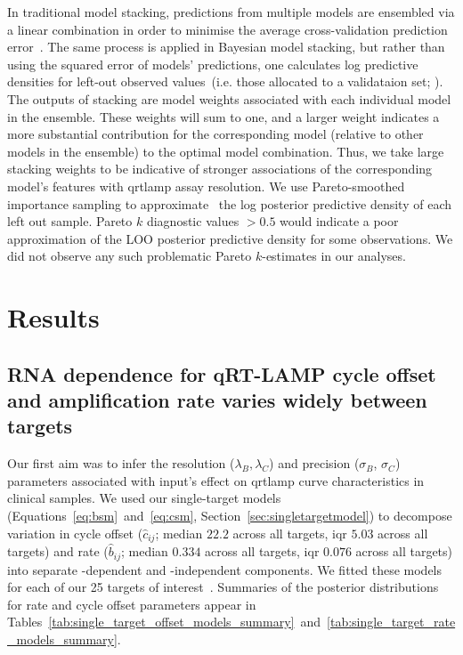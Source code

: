\documentclass[../thesis.tex]{subfiles}
\begin{document}
In traditional model stacking, predictions from multiple models are ensembled via a linear combination in order to minimise the average cross-validation prediction error~\citep{wolpert_stacked_1992}. The same process is applied in Bayesian model stacking, but rather than using the squared error of models' predictions, one calculates log predictive densities for left-out observed values~(i.e. those allocated to a validataion set; \citealp{yao_using_2018}). The outputs of stacking are model weights associated with each individual model in the ensemble. These weights will sum to one, and a larger weight indicates a more substantial contribution for the corresponding model (relative to other models in the ensemble) to the optimal model combination. Thus, we take large stacking weights to be indicative of stronger associations of the corresponding model's features with \gls{qrtlamp} assay resolution. We use Pareto-smoothed importance sampling to approximate~\citep{vehtari_practical_2017, vehtari_pareto_2021} the log posterior predictive density of each left out sample. Pareto $k$ diagnostic values $>0.5$ would indicate a poor approximation of the LOO posterior predictive density for some observations. We did not observe any such problematic Pareto $k$-estimates in our analyses.

\section{Results \label{sec:results}}

\subsection{RNA dependence for qRT-LAMP cycle offset and amplification rate varies widely between targets\label{sec:sensitivityprecision}}
Our first aim was to infer the resolution ($\lambda_B, \lambda_C$) and precision ($\sigma_{B}$, $\sigma_{C}$) parameters associated with  input's effect on \gls{qrtlamp} curve characteristics in clinical samples. We used our single-target models (Equations~\ref{eq:bsm}~and~\ref{eq:csm}, Section~\ref{sec:singletargetmodel}) to decompose variation in cycle offset ($\hat{c}_{ij}$; median $22.2$ across all targets, \gls{iqr} $5.03$ across all targets) and rate ($\hat{b}_{ij}$; median $0.334$ across all targets, \gls{iqr} $0.076$ across all targets) into separate -dependent and -independent components. We fitted these models for each of our 25 targets of interest~\citep{he_optimization_2021}. Summaries of the posterior distributions for rate and cycle offset parameters appear in Tables~\ref{tab:single_target_offset_models_summary}~and~\ref{tab:single_target_rate_models_summary}. 
\end{document}
